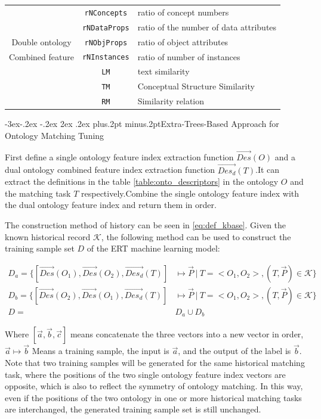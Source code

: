\documentclass[twoside]{article}
\makeatletter
\def\subsection{\@startsection{subsection}{2}{\z@}%
 {-3ex\@plus -.2ex \@minus -.2ex}%
 {2ex \@plus.2ex}%
{\normalfont\normalsize\protect\baselineskip=12.5pt plus.2pt minus.2pt\bfseries}}
\makeatother
\begin{document}
\begin{table}[htb!]
\begin{tabular}{@{}c|c|l@{}}
					& \texttt {rNConcepts} 	& ratio of concept numbers \\
					& \texttt {rNDataProps} & ratio of the number of data attributes \\
Double ontology     & \texttt {rNObjProps} 	& ratio of object attributes \\
Combined feature 	& \texttt {rNInstances} & ratio of number of instances \\
					& \texttt {LM} 			& text similarity \\
					& \texttt {TM} 			& Conceptual Structure Similarity \\
					& \texttt {RM} 			& Similarity relation \\ \bottomrule
\end{tabular}
\end{table}

\subsection{Extra-Trees-Based Approach for Ontology Matching Tuning}

First define a single ontology feature index extraction function $\vec{Des}(O)$ and a dual ontology combined feature index extraction function $\vec{Des_d}(T)$.It can extract the definitions in the table \ref{table:onto_descriptors} in the ontology $O$ and the matching task $T$ respectively.Combine the single ontology feature index with the dual ontology feature index and return them in order.

The construction method of history can be seen in \ref{eq:def_kbase}.
Given the known historical record $\mathcal{K}$, the following method can be used to construct the training sample set $D$ of the ERT machine learning model:

\begin{align}
D_a = \{ [\vec{Des}(O_1), \vec{Des}(O_2), \vec{Des_d}(T)] &\mapsto \vec{P} \ | \ T = <O_1,O_2>, (T,\vec{P}) \in \mathcal{K} \} \\
D_b = \{ [\vec{Des}(O_2), \vec{Des}(O_1), \vec{Des_d}(T)] &\mapsto \vec{P} \ | \ T = <O_1,O_2>, (T,\vec{P}) \in \mathcal{K} \} \\
D =& D_a \cup D_b
\end{align}

Where $[\vec{a},\vec{b},\vec{c}]$ means concatenate the three vectors into a new vector in order, $\vec{a}\mapsto\vec{b}$ Means a training sample, the input is $\vec{a}$, and the output of the label is $\vec{b}$.
Note that two training samples will be generated for the same historical matching task, where the positions of the two single ontology feature index vectors are opposite, which is also to reflect the symmetry of ontology matching.
In this way, even if the positions of the two ontology in one or more historical matching tasks are interchanged, the generated training sample set is still unchanged.
\end{document}
